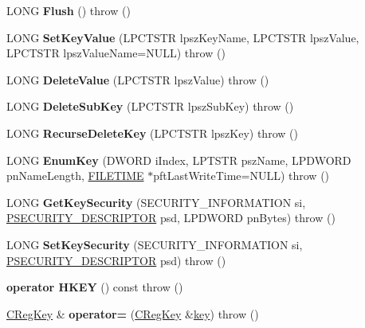 \begin{DoxyCompactItemize}
\mbox{\label{class_a_t_l_1_1_c_reg_key_ab991ef684e55259329b8e22595f984a9}} 
L\+O\+NG {\bfseries Flush} ()  throw ()
\item 
\mbox{\label{class_a_t_l_1_1_c_reg_key_abc1107b6a95b9e91d920e30b3d944685}} 
L\+O\+NG {\bfseries Set\+Key\+Value} (L\+P\+C\+T\+S\+TR lpsz\+Key\+Name, L\+P\+C\+T\+S\+TR lpsz\+Value, L\+P\+C\+T\+S\+TR lpsz\+Value\+Name=N\+U\+LL)  throw ()
\item 
\mbox{\label{class_a_t_l_1_1_c_reg_key_a7dcf129c9fc4e005b42d8f2fa7bb087c}} 
L\+O\+NG {\bfseries Delete\+Value} (L\+P\+C\+T\+S\+TR lpsz\+Value)  throw ()
\item 
\mbox{\label{class_a_t_l_1_1_c_reg_key_acc9665c410b3c7dd44632a86731d3171}} 
L\+O\+NG {\bfseries Delete\+Sub\+Key} (L\+P\+C\+T\+S\+TR lpsz\+Sub\+Key)  throw ()
\item 
\mbox{\label{class_a_t_l_1_1_c_reg_key_a60c81f776fdd099f0fca1d11ec2c1898}} 
L\+O\+NG {\bfseries Recurse\+Delete\+Key} (L\+P\+C\+T\+S\+TR lpsz\+Key)  throw ()
\item 
\mbox{\label{class_a_t_l_1_1_c_reg_key_a47c88125263564399a1528f14ab8035d}} 
L\+O\+NG {\bfseries Enum\+Key} (D\+W\+O\+RD i\+Index, L\+P\+T\+S\+TR psz\+Name, L\+P\+D\+W\+O\+RD pn\+Name\+Length, \hyperlink{struct___f_i_l_e_t_i_m_e}{F\+I\+L\+E\+T\+I\+ME} $\ast$pft\+Last\+Write\+Time=N\+U\+LL)  throw ()
\item 
\mbox{\label{class_a_t_l_1_1_c_reg_key_aa0a6805d4dda2c121535de64099db9db}} 
L\+O\+NG {\bfseries Get\+Key\+Security} (S\+E\+C\+U\+R\+I\+T\+Y\+\_\+\+I\+N\+F\+O\+R\+M\+A\+T\+I\+ON si, \hyperlink{struct___s_e_c_u_r_i_t_y___d_e_s_c_r_i_p_t_o_r}{P\+S\+E\+C\+U\+R\+I\+T\+Y\+\_\+\+D\+E\+S\+C\+R\+I\+P\+T\+OR} psd, L\+P\+D\+W\+O\+RD pn\+Bytes)  throw ()
\item 
\mbox{\label{class_a_t_l_1_1_c_reg_key_a75b1db9c52a7f9bee73214c2f94254d1}} 
L\+O\+NG {\bfseries Set\+Key\+Security} (S\+E\+C\+U\+R\+I\+T\+Y\+\_\+\+I\+N\+F\+O\+R\+M\+A\+T\+I\+ON si, \hyperlink{struct___s_e_c_u_r_i_t_y___d_e_s_c_r_i_p_t_o_r}{P\+S\+E\+C\+U\+R\+I\+T\+Y\+\_\+\+D\+E\+S\+C\+R\+I\+P\+T\+OR} psd)  throw ()
\item 
\mbox{\label{class_a_t_l_1_1_c_reg_key_a2147b44f5c059d40c10eff716af1f0bd}} 
{\bfseries operator H\+K\+EY} () const  throw ()
\item 
\mbox{\label{class_a_t_l_1_1_c_reg_key_ad6c66c98cd4f864809b5295a43d0ff9f}} 
\hyperlink{class_a_t_l_1_1_c_reg_key}{C\+Reg\+Key} \& {\bfseries operator=} (\hyperlink{class_a_t_l_1_1_c_reg_key}{C\+Reg\+Key} \&\hyperlink{structkey}{key})  throw ()
\end{DoxyCompactItemize}
